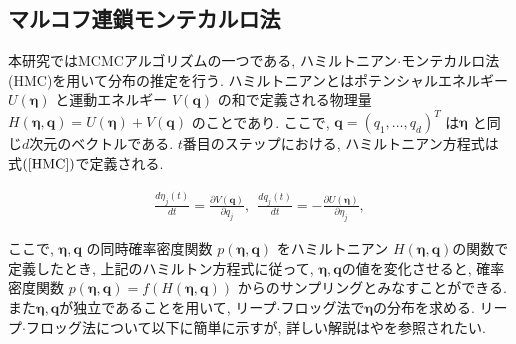 \documentclass[a4paper,11pt]{jarticle}
\begin{document}
\subsection{マルコフ連鎖モンテカルロ法}

本研究ではMCMCアルゴリズムの一つである, ハミルトニアン$\cdot$モンテカルロ法(HMC)を用いて分布の推定を行う. 
ハミルトニアンとはポテンシャルエネルギー $U(\bm \eta)$ と運動エネルギー $V(\bm q)$ の和で定義される物理量 $H(\bm \eta, \bm q) = U(\bm \eta) + V(\bm q)$ のことであり. ここで, $\bm q = (q_1, \dots, q_d)^T$ は$\bm \eta$ と同じ$d$次元のベクトルである. $t$番目のステップにおける, ハミルトニアン方程式は式$(\ref{HMC})$で定義される. 

\vspace{-1zh}
\begin{eqnarray}
\label{HMC}
\frac{d \eta_j(t)}{dt} = \frac{\partial V(\bm q)}{\partial q_j},\ \ \frac{d q_j(t)}{dt} = - \frac{\partial U(\bm \eta)}{\partial \eta_j},
\end{eqnarray}

\noindent
ここで, $\bm \eta, \bm q$ の同時確率密度関数 $p(\bm \eta, \bm q)$ をハミルトニアン $H(\bm \eta, \bm q)$の関数で定義したとき, 上記のハミルトン方程式に従って, $\bm \eta, \bm q$の値を変化させると, 確率密度関数 $p(\bm \eta, \bm q) = f(H(\bm \eta, \bm q))$ からのサンプリングとみなすことができる. また$\bm \eta, \bm q$が独立であることを用いて, リープ$\cdot$フロッグ法で$\bm \eta$の分布を求める. リープ$\cdot$フロッグ法について以下に簡単に示すが, 詳しい解説は\citet{HMC}や\citet{NUTS}を参照されたい.
\end{document}

